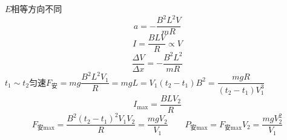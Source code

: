 $E$相等\quad 方向不同
\[ a=-\frac{B^2L^2V}{mR} \]
\[ I=\frac{BLV}{R}\propto V \]
\[ \frac{\Delta V}{\Delta x}=-\frac{B^2L^2}{mR} \]
$t_1\sim t_2$匀速\quad$F_{\text{安}}=mg$\quad$\dfrac{B^2L^2V_1}{R}=mg$\quad$L=V_1(t_2-t_1)$\quad$B^2=\dfrac{mgR}{(t_2-t_1)V_1^3}$ %
\[ I_{\max}=\frac{BLV_2}{R} \]
\[ F_{\text{安}\max}=\frac{B^2(t_2-t_1)^2V_1V_2}{R}=\frac{mgV_2}{V_1}\qquad P_{\text{安}\max}=F_{\text{安}\max}V_2=\frac{mgV_2^2}{V_1} \] %
